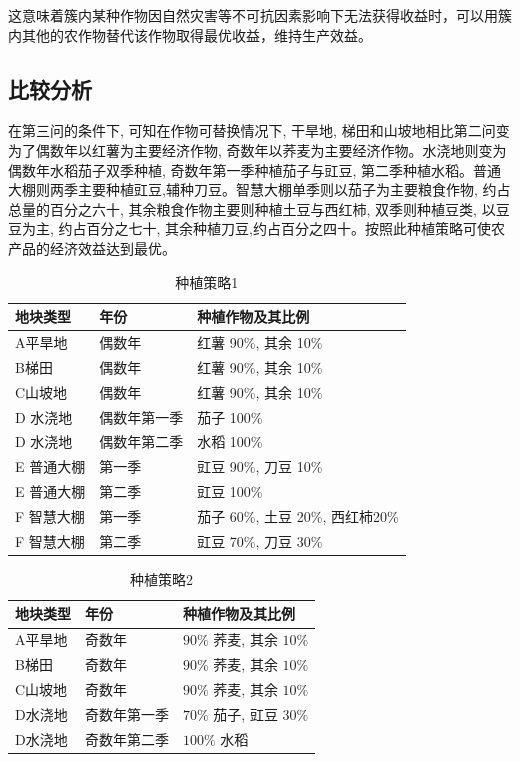 \documentclass[12pt]{ctexart}
\begin{document}
	
	这意味着簇内某种作物因自然灾害等不可抗因素影响下无法获得收益时，可以用簇内其他的农作物替代该作物取得最优收益，维持生产效益。

\newpage
	\subsection{比较分析}
	
	
	在第三问的条件下, 可知在作物可替换情况下, 干旱地, 梯田和山坡地相比第二问变为了偶数年以红薯为主要经济作物, 奇数年以荞麦为主要经济作物。水浇地则变为偶数年水稻茄子双季种植, 奇数年第一季种植茄子与豇豆, 第二季种植水稻。普通大棚则两季主要种植豇豆,辅种刀豆。智慧大棚单季则以茄子为主要粮食作物, 约占总量的百分之六十, 其余粮食作物主要则种植土豆与西红柿, 双季则种植豆类, 以豆豆为主, 约占百分之七十, 其余种植刀豆,约占百分之四十。按照此种植策略可使农产品的经济效益达到最优。
	
	
	\begin{table}[htbp]
		\centering
		\begin{tabular}{m{5cm} m{5cm} m{6cm}}  
			\toprule  
			地块类型 & 年份 & 种植作物及其比例\\  
			\midrule  
			A平旱地 & 偶数年 & 红薯 90\%, 其余 10\%\\  
			B梯田 & 偶数年& 红薯 90\%, 其余 10\%\\  
			C山坡地  & 偶数年&  红薯 90\%, 其余 10\%\\
			D 水浇地 & 偶数年第一季 & 茄子 100\% \\
			D 水浇地 & 偶数年第二季 & 水稻 100\% \\
			E 普通大棚 & 第一季 & 豇豆 90\%, 刀豆 10\% \\
			E 普通大棚 & 第二季 & 豇豆 100\% \\
			F 智慧大棚 & 第一季 & 茄子 60\%, 土豆 20\%, 西红柿20\% \\
			F 智慧大棚 & 第二季 & 豇豆 70\%, 刀豆 30\% \\
			\bottomrule  
		\end{tabular}  
		\caption{种植策略1}
	\end{table}
	
	\vspace{-0.5cm} %
	

	\begin{table}[htbp]
		\centering
		\begin{tabular}{m{5cm} m{5cm}m{6cm}}  
			\toprule  
			地块类型 & 年份 & 种植作物及其比例\\  
			\midrule  
			A平旱地 & 奇数年 & $90 \%$ 荞麦, 其余 $10 \%$ \\
			B梯田 & 奇数年 & $90 \%$ 荞麦, 其余 $10 \%$ \\
			C山坡地 & 奇数年 & $90 \%$ 荞麦, 其余 $10 \%$ \\
			D水浇地 & 奇数年第一季 & $70 \%$ 茄子, 豇豆 $30 \%$ \\
			D水浇地 & 奇数年第二季 & $100 \%$ 水稻 \\
			\bottomrule  
		\end{tabular}  
		\caption{种植策略2}
	\end{table}
	
\end{document}
